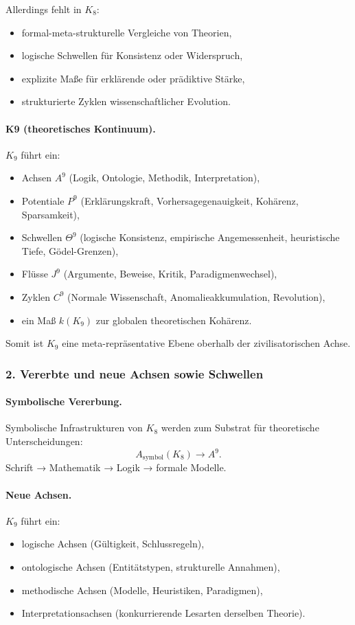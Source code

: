 Allerdings fehlt in $K_8$:
\begin{itemize}
  \item formal-meta-strukturelle Vergleiche von Theorien,
  \item logische Schwellen für Konsistenz oder Widerspruch,
  \item explizite Maße für erklärende oder prädiktive Stärke,
  \item strukturierte Zyklen wissenschaftlicher Evolution.
\end{itemize}

\paragraph{K9 (theoretisches Kontinuum).}
$K_9$ führt ein:
\begin{itemize}
  \item Achsen $A^9$ (Logik, Ontologie, Methodik, Interpretation),
  \item Potentiale $P^9$ (Erklärungskraft, Vorhersagegenauigkeit,
        Kohärenz, Sparsamkeit),
  \item Schwellen $\Theta^9$ (logische Konsistenz, empirische Angemessenheit,
        heuristische Tiefe, Gödel-Grenzen),
  \item Flüsse $J^9$ (Argumente, Beweise, Kritik, Paradigmenwechsel),
  \item Zyklen $C^9$ (Normale Wissenschaft, Anomalieakkumulation, Revolution),
  \item ein Maß $k(K_9)$ zur globalen theoretischen Kohärenz.
\end{itemize}

Somit ist $K_9$ eine meta-repräsentative Ebene oberhalb der zivilisatorischen
Achse.

\subsubsection{2. Vererbte und neue Achsen sowie Schwellen}

\paragraph{Symbolische Vererbung.}
Symbolische Infrastrukturen von $K_8$ werden zum Substrat für theoretische
Unterscheidungen:
\[
A_{\mathrm{symbol}}(K_8) \rightarrow A^9.
\]
Schrift → Mathematik → Logik → formale Modelle.

\paragraph{Neue Achsen.}
$K_9$ führt ein:
\begin{itemize}
  \item logische Achsen (Gültigkeit, Schlussregeln),
  \item ontologische Achsen (Entitätstypen, strukturelle Annahmen),
  \item methodische Achsen (Modelle, Heuristiken, Paradigmen),
  \item Interpretationsachsen (konkurrierende Lesarten derselben Theorie).
\end{itemize}

